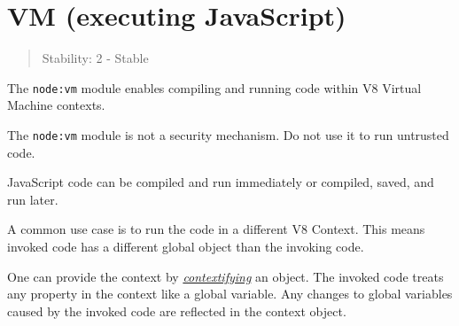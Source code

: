 \section{VM (executing JavaScript)}\label{vm-executing-javascript}

\begin{quote}
Stability: 2 - Stable
\end{quote}

The \texttt{node:vm} module enables compiling and running code within V8
Virtual Machine contexts.

The \texttt{node:vm} module is not a security mechanism. Do not use it
to run untrusted code.

JavaScript code can be compiled and run immediately or compiled, saved,
and run later.

A common use case is to run the code in a different V8 Context. This
means invoked code has a different global object than the invoking code.

One can provide the context by
\hyperref[what-does-it-mean-to-contextify-an-object]{\emph{contextifying}}
an object. The invoked code treats any property in the context like a
global variable. Any changes to global variables caused by the invoked
code are reflected in the context object.

\begin{Shaded}
\begin{Highlighting}[]
\OperatorTok{=} \NormalTok{(}\NormalTok{)}\OperatorTok{;}

\OperatorTok{=} \OperatorTok{;}

\OperatorTok{=}\NormalTok{ \{ }\OperatorTok{:} \NormalTok{ \}}\OperatorTok{;}
\OperatorTok{;} 

\OperatorTok{=} \OperatorTok{;}
\OperatorTok{,}\OperatorTok{;}

\NormalTok{)}\OperatorTok{;} 
\NormalTok{)}\OperatorTok{;} 

\OperatorTok{;} 
\end{Highlighting}
\end{Shaded}


